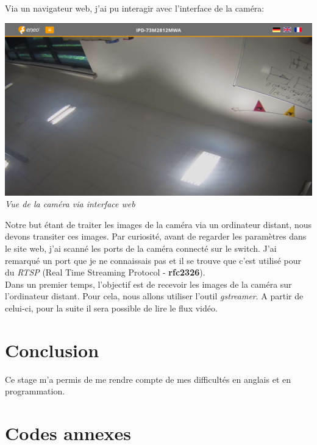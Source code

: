 \documentclass[12pt, french]{report}
\begin{document}
Via un navigateur web, j'ai pu interagir avec l'interface de la caméra:
\begin{center}
\includegraphics[width=\textwidth]{Cameras/WebSiteView.png}\\
\textit{Vue de la caméra via interface web}\\
\end{center}

Notre but étant de traiter les images de la caméra via un ordinateur distant, nous devons transiter ces images. Par curiosité, avant de regarder les paramètres dans le site web, j'ai scanné les ports de la caméra connecté sur le switch. J'ai remarqué un port que je ne connaissais pas et il se trouve que c'est utilisé pour du \textit{RTSP} (Real Time Streaming Protocol - \textbf{rfc2326}). \\

Dans un premier temps, l'objectif est de recevoir les images de la caméra sur l'ordinateur distant. Pour cela, nous allons utiliser l'outil \textit{gstreamer}. A partir de celui-ci, pour la suite il sera possible de lire le flux vidéo.

\newpage
\section{Conclusion}

Ce stage m'a permis de me rendre compte de mes difficultés en anglais et en programmation. 




\newpage
\section{Codes annexes}
\end{document}
